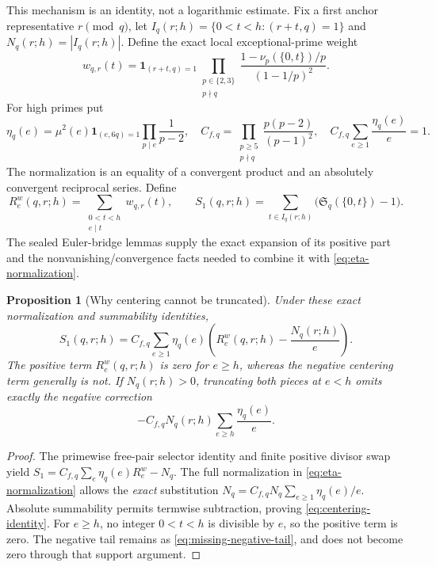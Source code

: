 \documentclass[11pt]{article}
\newcommand{\one}{\mathbf 1}
\newtheorem{proposition}[theorem]{Proposition}
\theoremstyle{definition}
\theoremstyle{remark}
\newcommand{\SSer}{\mathfrak S}
\newcommand{\1}{\mathbf 1}
\newcommand{\e}{\mathrm e}
\begin{document}
This mechanism is an identity, not a logarithmic estimate.
Fix a first anchor representative $r\pmod q$, let
$I_q(r;h)=\{0<t<h:(r+t,q)=1\}$ and
$N_q(r;h)=|I_q(r;h)|$. Define the exact local exceptional-prime
weight
\begin{equation}\label{eq:low-weight}
 w_{q,r}(t)=\one_{(r+t,q)=1}
 \prod_{\substack{p\in\{2,3\}\\p\nmid q}}
 \frac{1-\nu_p(\{0,t\})/p}{(1-1/p)^2}.
\end{equation}
For high primes put
\begin{equation}\label{eq:eta-normalization}
 \eta_q(e)=\mu^2(e)\one_{(e,6q)=1}
    \prod_{p\mid e}\frac1{p-2},\quad
 C_{f,q}=\prod_{\substack{p\ge5\\p\nmid q}}
             \frac{p(p-2)}{(p-1)^2},\quad
 C_{f,q}\sum_{e\ge1}\frac{\eta_q(e)}e=1.
\end{equation}
The normalization is an equality of a convergent product
and an absolutely convergent reciprocal series. Define
\[
 R_e^w(q,r;h)=\sum_{\substack{0<t<h\\e\mid t}}w_{q,r}(t),
 \qquad S_1(q,r;h)=\sum_{t\in I_q(r;h)}
           \bigl(\SSer_q(\{0,t\})-1\bigr).
\]
The sealed Euler-bridge lemmas supply the exact expansion of
its positive part and the nonvanishing/convergence facts
needed to combine it with \eqref{eq:eta-normalization}.

\begin{proposition}[Why centering cannot be truncated]
\label{prop:centering-tail}
Under these exact normalization and summability identities,
\begin{equation}\label{eq:centering-identity}
 \boxed{S_1(q,r;h)=C_{f,q}\sum_{e\ge1}\eta_q(e)
     \left(R_e^w(q,r;h)-\frac{N_q(r;h)}e\right).}
\end{equation}
The positive term $R_e^w(q,r;h)$ is zero for $e\ge h$,
whereas the negative centering term generally is not.
If $N_q(r;h)>0$, truncating both pieces at $e<h$ omits
exactly the negative correction
\begin{equation}\label{eq:missing-negative-tail}
 -C_{f,q}N_q(r;h)\sum_{e\ge h}\frac{\eta_q(e)}e.
\end{equation}
\end{proposition}
\begin{proof}
The primewise free-pair selector identity and finite
positive divisor swap yield
$S_1=C_{f,q}\sum_e\eta_q(e)R_e^w-N_q$.
The full normalization in \eqref{eq:eta-normalization}
allows the \emph{exact} substitution
$N_q=C_{f,q}N_q\sum_{e\ge1}\eta_q(e)/e$.
Absolute summability permits termwise subtraction, proving
\eqref{eq:centering-identity}. For $e\ge h$, no integer
$0<t<h$ is divisible by $e$, so the positive term is zero.
The negative tail remains as \eqref{eq:missing-negative-tail},
and does not become zero through that support argument.
\end{proof}
\end{document}
